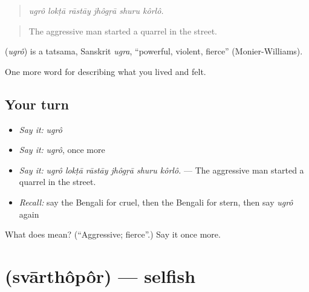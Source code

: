 \begin{quote}
     
\end{quote}

\begin{quote}
\emph{ugrô lokṭā rāstāy jhôgṛā shuru kôrlô.}
\end{quote}

\begin{quote}
The aggressive man started a quarrel in the street.
\end{quote}

\begin{cousinweb}
\textbf{} (\emph{ugrô}) is a tatsama, Sanskrit \emph{ugra}, \textquotedblleft{}powerful, violent, fierce\textquotedblright{} (Monier-Williams).
\end{cousinweb}

\begin{grammarlens}[title={What you've built}]
One more word for describing what you lived and felt.
\end{grammarlens}

\subsection*{Your turn}
\begin{itemize}
\raggedright
  \item \emph{Say it:} \emph{ugrô}
  \item \emph{Say it:} \emph{ugrô}, once more
  \item \emph{Say it:} \emph{ugrô lokṭā rāstāy jhôgṛā shuru kôrlô.} — The aggressive man started a quarrel in the street.
  \item \emph{Recall:} say the Bengali for cruel, then the Bengali for stern, then say \emph{ugrô} again
\end{itemize}

\begin{tcolorbox}[breakable,colback=teal!4,colframe=teal!35!black,title={Before you move on}]
What does  mean? (\textquotedblleft{}Aggressive; fierce\textquotedblright{}.) Say it once more.
\end{tcolorbox}
\section[\texorpdfstring{\bn{স্বার্থপর} (svārthôpôr)}{স্বার্থপর (svārthôpôr)}]{ (svārthôpôr) — selfish}

\label{lesson:BN-C460-svarthopor}



